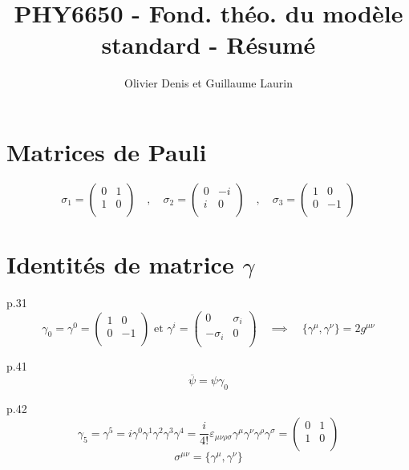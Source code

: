 \documentclass[12pt]{article}
\begin{document}
\title{PHY6650 - Fond. théo. du modèle standard - Résumé}
\author{Olivier Denis et Guillaume Laurin}
\maketitle
\newpage

\section{Matrices de Pauli}
\begin{equation}
    \sigma_1 = \begin{pmatrix} 0 & 1\\ 1 & 0\\ \end{pmatrix} \quad , \quad \sigma_2 = \begin{pmatrix} 0  & -i \\ i & 0\\ \end{pmatrix} \quad , \quad \sigma_3 = \begin{pmatrix} 1 & 0 \\ 0 & -1 \\ \end{pmatrix}
\end{equation}

\section{Identités de matrice $\gamma$}
p.31\\
\begin{equation}
  \gamma_0 = \gamma^0 = \begin{pmatrix}
    1 & 0 \\
    0 & -1\\
\end{pmatrix} \text{  et   } \gamma^i = \begin{pmatrix}
  0 & \sigma_i \\
  -\sigma_i & 0\\
\end{pmatrix} \quad \implies \quad \{\gamma^\mu, \gamma^\nu\} = 2 g^{\mu\nu}
\end{equation}

p.41 \\
\begin{equation}
  \overline{\psi} = \psi\gamma_0
\end{equation}

p.42 \\
\begin{equation}
  \gamma_5 = \gamma^5 = i\gamma^0\gamma^1\gamma^2\gamma^3\gamma^4 = \frac{i}{4!}\varepsilon_{\mu\nu\rho\sigma}\gamma^\mu\gamma^\nu\gamma^\rho\gamma^\sigma=\begin{pmatrix}0 & 1 \\ 1 & 0\\
\end{pmatrix}
\end{equation}
\begin{equation}
  \sigma^{\mu\nu} = \{\gamma^\mu,\gamma^\nu\}
\end{equation}
\end{document}

